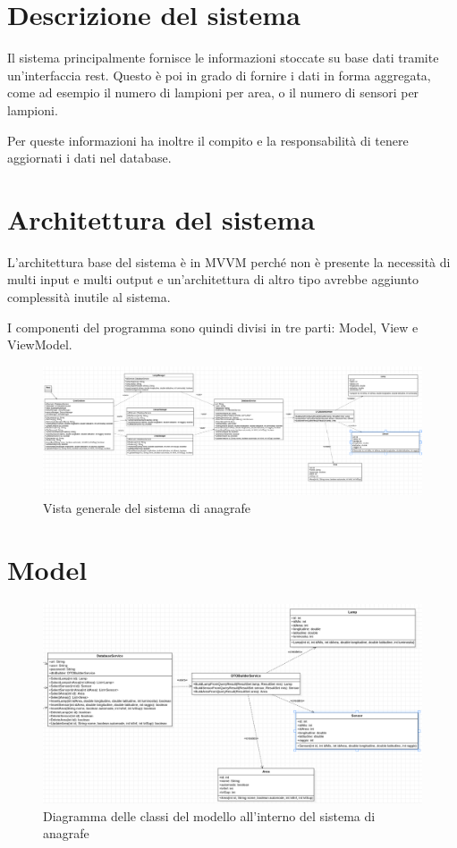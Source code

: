 \section{Descrizione del sistema}

Il sistema principalmente fornisce le informazioni stoccate su base dati tramite un'interfaccia rest.
Questo è poi in grado di fornire i dati in forma aggregata, come ad esempio il numero di lampioni per area, o il numero di sensori per lampioni.

Per queste informazioni ha inoltre il compito e la responsabilità di tenere aggiornati i dati nel database.

\section{Architettura del sistema}

L'architettura base del sistema è in MVVM perché non è presente la necessità di multi input e multi output e un'architettura di altro tipo avrebbe aggiunto complessità inutile al sistema.

I componenti del programma sono quindi divisi in tre parti: Model, View e ViewModel.

\begin{figure}[h]
    \centering
    \includegraphics[width=\textwidth]{img/anagrafe_generale.png}
    \caption{Vista generale del sistema di anagrafe}
    \label{fig:general_anagrafe}
\end{figure}

\section{Model}
\begin{figure}[h]
    \centering
    \includegraphics[width=\textwidth]{img/model_anagrafe.png}
    \caption{Diagramma delle classi del modello all'interno del sistema di anagrafe}
    \label{fig:model_anagrafe}
\end{figure}

